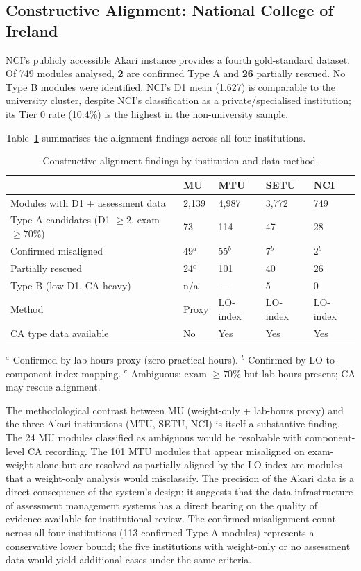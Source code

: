 \documentclass[12pt, a4paper]{article}
\begin{document}
\subsection{Constructive Alignment: National College of Ireland}

NCI's publicly accessible Akari instance provides a fourth gold-standard dataset.
Of 749 modules analysed, \textbf{2} are confirmed Type A and \textbf{26} partially
rescued. No Type B modules were identified. NCI's D1 mean (1.627) is comparable to
the university cluster, despite NCI's classification as a private/specialised
institution; its Tier 0 rate (10.4\%) is the highest in the non-university sample.

Table~\ref{tab:comparison} summarises the alignment findings across all four institutions.

\begin{table}[H]
\centering
\caption{Constructive alignment findings by institution and data method.}
\label{tab:comparison}
\begin{tabular}{lllll}
\toprule
& \textbf{MU} & \textbf{MTU} & \textbf{SETU} & \textbf{NCI} \\
\midrule
Modules with D1 + assessment data & 2,139 & 4,987 & 3,772 & 749 \\
Type A candidates (D1 $\geq 2$, exam $\geq 70\%$) & 73 & 114 & 47 & 28 \\
Confirmed misaligned & 49$^a$ & 55$^b$ & 7$^b$ & 2$^b$ \\
Partially rescued & 24$^c$ & 101 & 40 & 26 \\
Type B (low D1, CA-heavy) & n/a & --- & 5 & 0 \\
Method & Proxy & LO-index & LO-index & LO-index \\
CA type data available & No & Yes & Yes & Yes \\
\bottomrule
\end{tabular}
\end{table}

\noindent
$^a$ Confirmed by lab-hours proxy (zero practical hours). $^b$ Confirmed by
LO-to-component index mapping. $^c$ Ambiguous: exam $\geq 70\%$ but lab hours present; CA may rescue alignment.

The methodological contrast between MU (weight-only + lab-hours proxy) and the three
Akari institutions (MTU, SETU, NCI) is itself a substantive finding.
The 24 MU modules classified as ambiguous would be resolvable with component-level
CA recording. The 101 MTU modules that appear misaligned on exam-weight alone but
are resolved as partially aligned by the LO index are modules that a weight-only
analysis would misclassify. The precision of the Akari data is a direct consequence
of the system's design; it suggests that the data infrastructure of assessment
management systems has a direct bearing on the quality of evidence available for
institutional review. The confirmed misalignment count across all four institutions
(113 confirmed Type A modules) represents a conservative lower bound; the five
institutions with weight-only or no assessment data would yield additional cases
under the same criteria.
\end{document}
